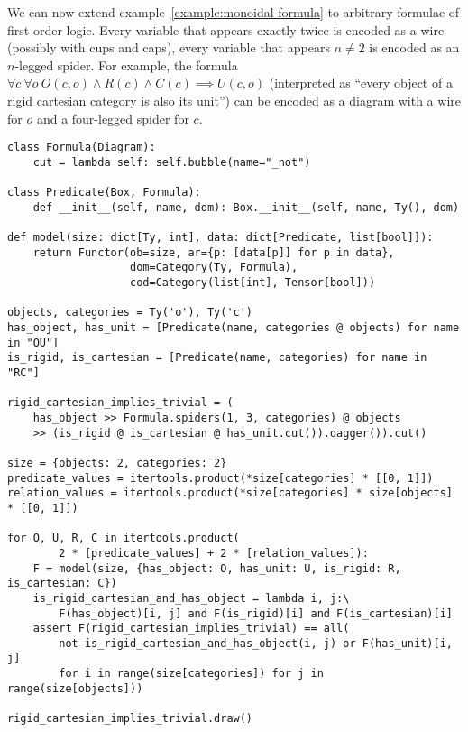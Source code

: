 \begin{example}
We can now extend example~\ref{example:monoidal-formula} to arbitrary formulae of first-order logic.
Every variable that appears exactly twice is encoded as a wire (possibly with cups and caps), every variable that appears $n \neq 2$ is encoded as an $n$-legged spider.
For example, the formula $\forall c \ \forall o \ O(c, o) \land R(c) \land C(c) \implies U(c, o)$ (interpreted as ``every object of a rigid cartesian category is also its unit'') can be encoded as a diagram with a wire for $o$ and a four-legged spider for $c$.

\begin{verbatim}
class Formula(Diagram):
    cut = lambda self: self.bubble(name="_not")

class Predicate(Box, Formula):
    def __init__(self, name, dom): Box.__init__(self, name, Ty(), dom)

def model(size: dict[Ty, int], data: dict[Predicate, list[bool]]):
    return Functor(ob=size, ar={p: [data[p]] for p in data},
                   dom=Category(Ty, Formula),
                   cod=Category(list[int], Tensor[bool]))

objects, categories = Ty('o'), Ty('c')
has_object, has_unit = [Predicate(name, categories @ objects) for name in "OU"]
is_rigid, is_cartesian = [Predicate(name, categories) for name in "RC"]

rigid_cartesian_implies_trivial = (
    has_object >> Formula.spiders(1, 3, categories) @ objects
    >> (is_rigid @ is_cartesian @ has_unit.cut()).dagger()).cut()

size = {objects: 2, categories: 2}
predicate_values = itertools.product(*size[categories] * [[0, 1]])
relation_values = itertools.product(*size[categories] * size[objects] * [[0, 1]])

for O, U, R, C in itertools.product(
        2 * [predicate_values] + 2 * [relation_values]):
    F = model(size, {has_object: O, has_unit: U, is_rigid: R, is_cartesian: C})
    is_rigid_cartesian_and_has_object = lambda i, j:\
        F(has_object)[i, j] and F(is_rigid)[i] and F(is_cartesian)[i]
    assert F(rigid_cartesian_implies_trivial) == all(
        not is_rigid_cartesian_and_has_object(i, j) or F(has_unit)[i, j]
        for i in range(size[categories]) for j in range(size[objects]))

rigid_cartesian_implies_trivial.draw()
\end{verbatim}

\end{example}

